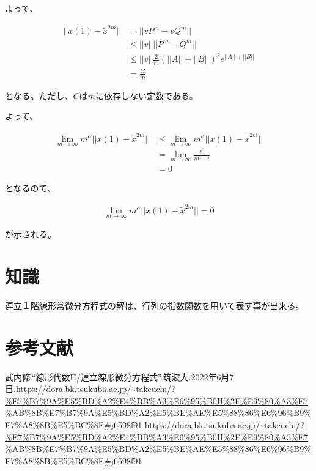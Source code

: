 \documentclass[a4paper, 10pt, dvipdfmx]{jlreq}
\begin{document}
よって、

\begin{align*}
  ||x(1)-\tilde{x}^{2m}|| & =||vP^m-vQ^m||                                                   \\
                          & \leq ||v||||P^m-Q^m||                                            \\
                          & \leq ||v||\frac{2}{m} \left(||A||+||B||\right)^2 e^{||A||+||B||} \\
                          & =\frac{C}{m}
\end{align*}

となる。ただし、$C$は$m$に依存しない定数である。

よって、

\begin{align*}
  \lim_{m \to \infty} m^\alpha ||x(1)-\tilde{x}^{2m}|| & \leq \lim_{m \to \infty} m^\alpha ||x(1)-\tilde{x}^{2m}|| \\
                                                       & =\lim_{m \to \infty} \frac{C}{m^{1-\alpha}}               \\
                                                       & =0
\end{align*}

となるので、

\begin{align*}
  \lim_{m \to \infty} m^\alpha ||x(1)-\tilde{x}^{2m}||=0
\end{align*}

が示される。

\section{知識}

連立１階線形常微分方程式の解は、行列の指数関数を用いて表す事が出来る。

\section{参考文献}
\begin{thebibliography}{9}
  武内修.“線形代数II/連立線形微分方程式”.筑波大.2022年6月7日.\url{https://dora.bk.tsukuba.ac.jp/~takeuchi/?%E7%B7%9A%E5%BD%A2%E4%BB%A3%E6%95%B0II%2F%E9%80%A3%E7%AB%8B%E7%B7%9A%E5%BD%A2%E5%BE%AE%E5%88%86%E6%96%B9%E7%A8%8B%E5%BC%8F#j6598f91}
  \url{https://dora.bk.tsukuba.ac.jp/~takeuchi/?%E7%B7%9A%E5%BD%A2%E4%BB%A3%E6%95%B0II%2F%E9%80%A3%E7%AB%8B%E7%B7%9A%E5%BD%A2%E5%BE%AE%E5%88%86%E6%96%B9%E7%A8%8B%E5%BC%8F#j6598f91}
\end{thebibliography}
\end{document}
